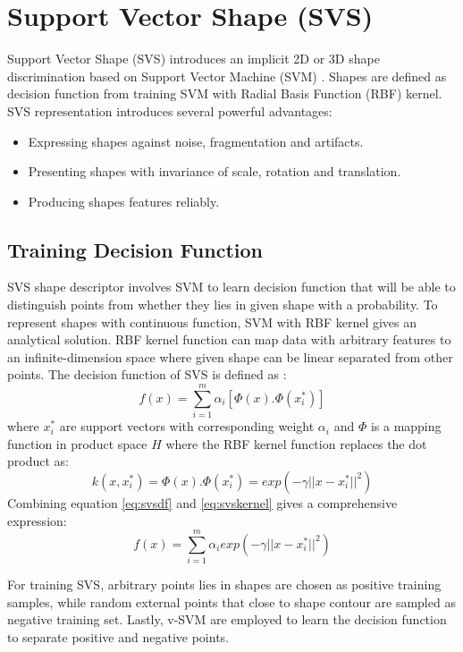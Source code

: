 \section{Support Vector Shape (SVS)}
\label{sec:bg_svs}
Support Vector Shape (SVS) introduces an implicit 2D or 3D shape discrimination based on Support Vector Machine (SVM) \cite{Nguyen2013}. Shapes are defined as decision function from training SVM with Radial Basis Function (RBF) kernel. SVS representation introduces several powerful advantages:
\begin{itemize}
  \item Expressing shapes against noise, fragmentation and artifacts.
  \item Presenting shapes with invariance of scale, rotation and translation.
  \item Producing shapes features reliably.
\end{itemize}

\subsection{Training Decision Function}
SVS shape descriptor involves SVM to learn decision function that will be able to distinguish points from whether they lies in given shape with a probability. To represent shapes with continuous function, SVM with RBF kernel gives an analytical solution. RBF kernel function can map data with arbitrary features to an infinite-dimension space where given shape can be linear separated from other points. The decision function of SVS is defined as \cite{Nguyen2013}:
\begin{equation}
\label{eq:svsdf}
f(x)=\sum^m_{i=1}\alpha_i[\Phi(x).\Phi(x^*_i)]
\end{equation}
where $x^*_i$ are support vectors with corresponding weight $\alpha_i$ and $\Phi$ is a mapping function in product space $H$ where the RBF kernel function replaces the dot product as:
\begin{equation}
\label{eq:svskernel}
k(x,x^*_i)=\Phi(x).\Phi(x^*_i)=exp(-\gamma||x-x^*_i||^2)
\end{equation}
Combining equation \ref{eq:svsdf} and \ref{eq:svskernel} gives a comprehensive expression:
\begin{equation}
\label{eq:svs}
f(x)=\sum^m_{i=1}\alpha_iexp(-\gamma||x-x^*_i||^2)
\end{equation}

For training SVS, arbitrary points lies in shapes are chosen as positive training samples, while random external points that close to shape contour are sampled as negative training set. Lastly, v-SVM \cite{scholkopf2001estimating} are employed to learn the decision function to separate positive and negative points.

